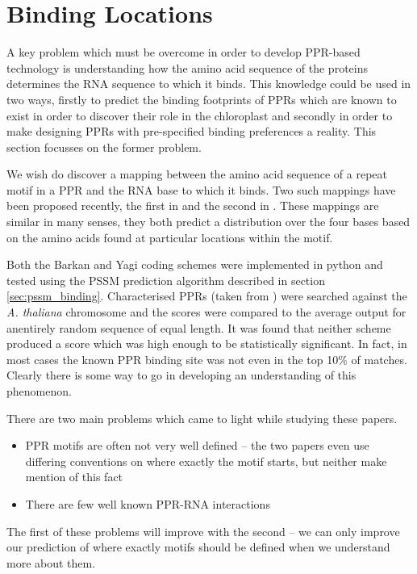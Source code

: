 \section{Binding Locations}

A key problem which must be overcome in order to develop PPR-based technology
is understanding how the amino acid sequence of the proteins determines the RNA
sequence to which it binds.
This knowledge could be used in two ways, firstly to predict the binding
footprints of PPRs which are known to exist in order to discover their role in
the chloroplast and secondly in order to make designing PPRs with pre-specified
binding preferences a reality.
This section focusses on the former problem.

We wish do discover a mapping between the amino acid sequence of a repeat
motif in a PPR and the RNA base to which it binds.
Two such mappings have been proposed recently, the first in \citet{Barkan2012}
and the second in \citet{Yagi2013}.
These mappings are similar in many senses, they both predict a distribution
over the four bases based on the amino acids found at particular locations
within the motif.

Both the Barkan and Yagi coding schemes were implemented in python and tested
using the PSSM prediction algorithm described in section
\ref{sec:pssm_binding}.
Characterised PPRs (taken from \citet{Yagi2013}) were searched against the
\emph{A. thaliana} chromosome and the scores were compared to the average 
output for anentirely random sequence of equal length.
It was found that neither scheme produced a score which was high enough to be 
statistically significant.
In fact, in most cases the known PPR binding site was not even in the top 10\%
of matches.
Clearly there is some way to go in developing an understanding of this
phenomenon.

There are two main problems which came to light while studying these papers.
\begin{itemize}
  \item PPR motifs are often not very well defined -- the two papers even use
    differing conventions on where exactly the motif starts, but neither make
    mention of this fact
  \item There are few well known PPR-RNA interactions
\end{itemize}
The first of these problems will improve with the second -- we can only improve
our prediction of where exactly motifs should be defined when we understand
more about them.


